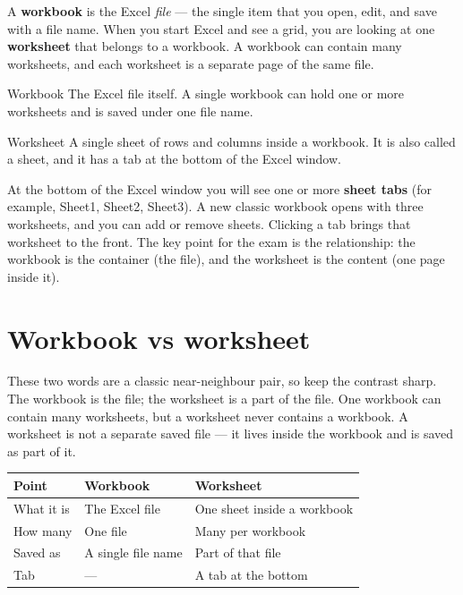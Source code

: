 A \textbf{workbook} is the Excel \emph{file} --- the single item that you
open, edit, and save with a file name. When you start Excel and see a grid,
you are looking at one \textbf{worksheet} that belongs to a workbook. A
workbook can contain many worksheets, and each worksheet is a separate page
of the same file.

\begin{definitionbox}{Workbook}
The Excel file itself. A single workbook can hold one or more worksheets and
is saved under one file name.
\end{definitionbox}

\begin{definitionbox}{Worksheet}
A single sheet of rows and columns inside a workbook. It is also called a
sheet, and it has a tab at the bottom of the Excel window.
\end{definitionbox}

At the bottom of the Excel window you will see one or more \textbf{sheet
tabs} (for example, Sheet1, Sheet2, Sheet3). A new classic workbook opens
with three worksheets, and you can add or remove sheets. Clicking a tab
brings that worksheet to the front. The key point for the exam is the
relationship: the workbook is the container (the file), and the worksheet is
the content (one page inside it).

\section{Workbook vs worksheet}
These two words are a classic near-neighbour pair, so keep the contrast
sharp. The workbook is the file; the worksheet is a part of the file. One
workbook can contain many worksheets, but a worksheet never contains a
workbook. A worksheet is not a separate saved file --- it lives inside the
workbook and is saved as part of it.

\begin{center}
\begin{tabular}{p{}p{}p{}}
\toprule
\textbf{Point} & \textbf{Workbook} & \textbf{Worksheet} \\
\midrule
What it is & The Excel file & One sheet inside a workbook \\
How many & One file & Many per workbook \\
Saved as & A single file name & Part of that file \\
Tab & --- & A tab at the bottom \\
\bottomrule
\end{tabular}
\end{center}

